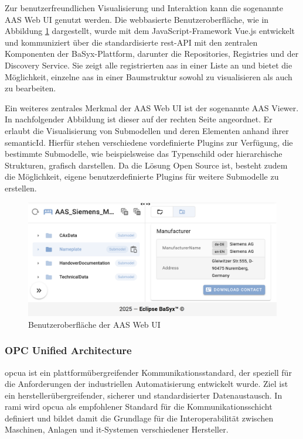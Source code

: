 Zur benutzerfreundlichen Visualisierung und Interaktion kann die sogenannte AAS Web UI genutzt werden.
Die webbasierte Benutzeroberfläche, wie in Abbildung \ref{fig:BasyxWebUI} dargestellt, wurde mit dem JavaScript-Framework Vue.js entwickelt und kommuniziert über die standardisierte \acs{rest}-API mit den zentralen Komponenten der BaSyx-Plattform, darunter die Repositories, Registries und der Discovery Service.
Sie zeigt alle registrierten \acs{aas} in einer Liste an und bietet die Möglichkeit, einzelne \acs{aas} in einer Baumstruktur sowohl zu visualisieren als auch zu bearbeiten. 

Ein weiteres zentrales Merkmal der AAS Web UI ist der sogenannte AAS Viewer.
In nachfolgender Abbildung ist dieser auf der rechten Seite angeordnet.
Er erlaubt die Visualisierung von Submodellen und deren Elementen anhand ihrer semanticId. 
Hierfür stehen verschiedene vordefinierte Plugins zur Verfügung, die bestimmte Submodelle, wie beispielsweise das Typenschild oder hierarchische Strukturen, grafisch darstellen.
Da die Lösung Open Source ist, besteht zudem die Möglichkeit, eigene benutzerdefinierte Plugins für weitere Submodelle zu erstellen. \cite{BaSyxWiki,BaSyxEclipse} 

\vspace{0.5em}
\begin{figure}[htbp]
    \centering
    \includegraphics[width=1\textwidth]{Bilder/AASWebUZIGrundlagen.png}
    \caption[Benutzeroberfläche der AAS Web UI]{Benutzeroberfläche der AAS Web UI}
    \label{fig:BasyxWebUI}
\end{figure}


\subsubsection{OPC Unified Architecture}
\acs{opcua} ist ein plattformübergreifender Kommunikationsstandard, der speziell für die Anforderungen der industriellen Automatisierung entwickelt wurde.
Ziel ist ein herstellerübergreifender, sicherer und standardisierter Datenaustausch.
In \acs{rami} \cite{RAMI4.0} wird \acs{opcua} als empfohlener Standard für die Kommunikationsschicht definiert und bildet damit die Grundlage für die Interoperabilität zwischen Maschinen, Anlagen und \acs{it}-Systemen verschiedener Hersteller.

